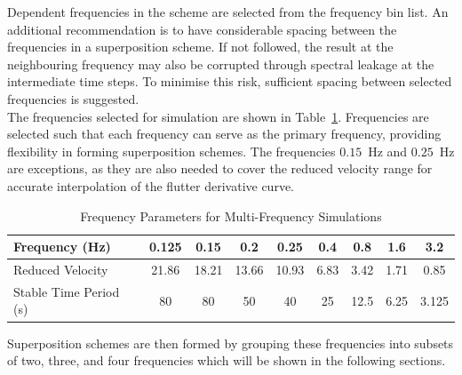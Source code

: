 \documentclass[../main]{subfiles}
\begin{document}
Dependent frequencies in the scheme are selected from the frequency bin list.
An additional recommendation is to have considerable spacing between the frequencies in a superposition scheme. 
If not followed, the result at the 
neighbouring frequency may also be corrupted through spectral leakage at the intermediate time steps.
To minimise this risk, sufficient spacing between selected frequencies is suggested.\\

The frequencies selected for simulation are shown in Table~\ref{tab:frequencies}.
Frequencies are selected such that each frequency can serve as the primary frequency, 
providing flexibility in forming superposition schemes.
The frequencies $0.15$~Hz and $0.25$~Hz are exceptions, 
as they are also needed to cover the reduced velocity range for accurate interpolation of the 
flutter derivative curve.\\

\begin{table}[htbp]
\centering
\caption{Frequency Parameters for Multi-Frequency Simulations}
\label{tab:frequencies}
\begin{tabular}{|l|cccccccc|}
\hline
\textbf{Frequency (Hz)} & 0.125 & 0.15 & 0.2 & 0.25 & 0.4 & 0.8 & 1.6 & 3.2 \\
\hline
Reduced Velocity        & 21.86 & 18.21 & 13.66 & 10.93 & 6.83 & 3.42 & 1.71 & 0.85 \\
Stable Time Period (s)  & 80    & 80    & 50    & 40    & 25   & 12.5 & 6.25 & 3.125 \\
\bottomrule
\end{tabular}
\end{table}

Superposition schemes are then formed by grouping these frequencies into subsets of two, three, and four frequencies which will be shown in the following sections.


\end{document}
